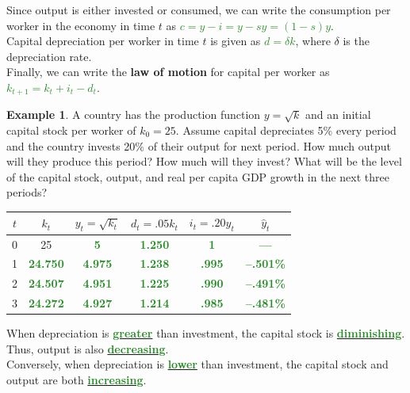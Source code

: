 \documentclass[11pt]{article}\usepackage[]{graphicx}\usepackage[]{color}
\theoremstyle{definition}
\newtheorem{exmp}{Example}[section]
\newcommand{\ddp}[1]{{\textbf{\textcolor{ForestGreen}{#1}}}}
\newcommand{\dd}[1]{{\underline{\textbf{\textcolor{ForestGreen}{#1}}}}}
\begin{document}
Since output is either invested or consumed, we can write the consumption per worker in the economy in time $t$ as \dd{$c = y - i = y - sy = (1-s)y$}.
\\


Capital depreciation per worker in time $t$ is given as \dd{$d =\delta k$}, where $\delta$ is the depreciation rate.
\\

Finally, we can write the \textbf{law of motion} for capital per worker as \dd{$k_{t+1} = k_t + i_t - d_t$}.

\begin{exmp} 
	A country has the production function $y = \sqrt{k}$ and an initial capital stock per worker of $k_0 = 25$. Assume capital depreciates 5\% every period and the country invests 20\% of their output for next period. How much output will they produce this period? How much will they invest? What will be the level of the capital stock, output, and real per capita GDP growth in the next three periods?
\end{exmp}
	\begin{table}[ht]
		\centering
		\begin{tabular}{c|c|c|c|c|c}        
			
			$t$ & $k_t$ & $y_t = \sqrt{k_t}$ & $d_t = .05k_t$ & $i_t = .20y_t$ & $\hat{y}_t$ \\
			\hline
			0 & 25 & \ddp{5} & \ddp{1.250} & \ddp{1} & \ddp{---} \\
			1 & \ddp{24.750} & \ddp{4.975} & \ddp{1.238} & \ddp{.995} & \ddp{--.501\%}\\
			2 & \ddp{24.507} & \ddp{4.951} & \ddp{1.225} & \ddp{.990} & \ddp{--.491\%}\\
			3 & \ddp{24.272} & \ddp{4.927} & \ddp{1.214} & \ddp{.985} & \ddp{--.481\%} \\
			
		\end{tabular}
	\end{table}

When depreciation is \dd{greater} than investment, the capital stock is \dd{diminishing}. Thus, output is also \dd{decreasing}.
\\

Conversely, when depreciation is \dd{lower} than investment, the capital stock and output are both \dd{increasing}.
\end{document}
